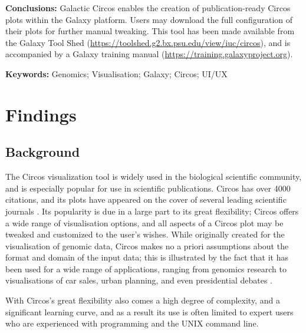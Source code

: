 \textbf{Conclusions:} Galactic Circos enables the creation of publication-ready Circos plots within the Galaxy platform. Users may download the full configuration of their plots for further manual tweaking. This tool has been made available from the Galaxy Tool Shed (\url{https://toolshed.g2.bx.psu.edu/view/iuc/circos}), and is accompanied by a Galaxy training manual (\url{https://training.galaxyproject.org}).

\textbf{Keywords: } Genomics; Visualisation; Galaxy; Circos; UI/UX


\section*{Findings}

\subsection*{Background}


The Circos visualization tool \cite{krzywinski2009} is widely used in the biological scientific community, and is especially popular for use in scientific publications. Circos has over 4000 citations, and its plots have appeared on the cover of several leading scientific journals \cite{circospubs}. Its popularity is due in a large part to its great flexibility; Circos offers a wide range of visualisation options, and all aspects of a Circos plot may be tweaked and customized to the user's wishes. While originally created for the visualisation of genomic data, Circos makes no a priori assumptions about the format and domain of the input data; this is illustrated by the fact that it has been used for a wide range of applications, ranging from genomics research to visualisations of car sales, urban planning, and even presidential debates \cite{circosnongenomic}.

With Circos's great flexibility also comes a high degree of complexity, and a significant learning curve, and as a result its use is often limited to expert users who are experienced with programming and the UNIX command line.

